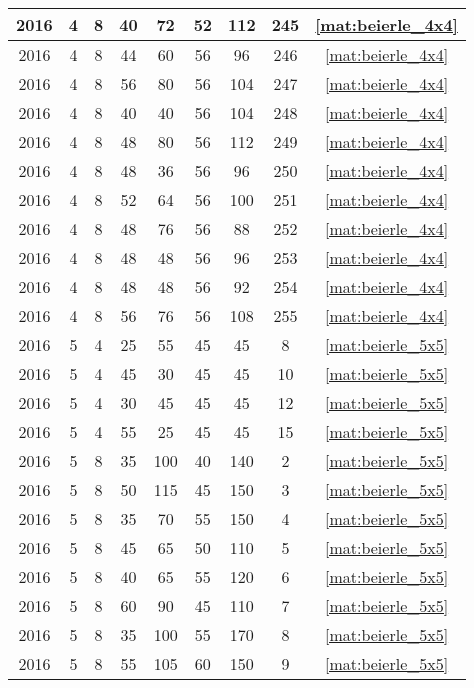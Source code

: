 \begin{longtable}{|c|c|c|c|c|c|c|c|c|}
2016 & 4 & 8 & 40 & 72 & 52 & 112 & 245 & \eqref{mat:beierle_4x4} \\ \hline 
2016 & 4 & 8 & 44 & 60 & 56 & 96 & 246 & \eqref{mat:beierle_4x4} \\ \hline 
2016 & 4 & 8 & 56 & 80 & 56 & 104 & 247 & \eqref{mat:beierle_4x4} \\ \hline 
2016 & 4 & 8 & 40 & 40 & 56 & 104 & 248 & \eqref{mat:beierle_4x4} \\ \hline 
2016 & 4 & 8 & 48 & 80 & 56 & 112 & 249 & \eqref{mat:beierle_4x4} \\ \hline 
2016 & 4 & 8 & 48 & 36 & 56 & 96 & 250 & \eqref{mat:beierle_4x4} \\ \hline 
2016 & 4 & 8 & 52 & 64 & 56 & 100 & 251 & \eqref{mat:beierle_4x4} \\ \hline 
2016 & 4 & 8 & 48 & 76 & 56 & 88 & 252 & \eqref{mat:beierle_4x4} \\ \hline 
2016 & 4 & 8 & 48 & 48 & 56 & 96 & 253 & \eqref{mat:beierle_4x4} \\ \hline 
2016 & 4 & 8 & 48 & 48 & 56 & 92 & 254 & \eqref{mat:beierle_4x4} \\ \hline 
2016 & 4 & 8 & 56 & 76 & 56 & 108 & 255 & \eqref{mat:beierle_4x4} \\ \hline 
2016 & 5 & 4 & 25 & 55 & 45 & 45 & 8 & \eqref{mat:beierle_5x5} \\ \hline 
2016 & 5 & 4 & 45 & 30 & 45 & 45 & 10 & \eqref{mat:beierle_5x5} \\ \hline 
2016 & 5 & 4 & 30 & 45 & 45 & 45 & 12 & \eqref{mat:beierle_5x5} \\ \hline 
2016 & 5 & 4 & 55 & 25 & 45 & 45 & 15 & \eqref{mat:beierle_5x5} \\ \hline 
2016 & 5 & 8 & 35 & 100 & 40 & 140 & 2 & \eqref{mat:beierle_5x5} \\ \hline 
2016 & 5 & 8 & 50 & 115 & 45 & 150 & 3 & \eqref{mat:beierle_5x5} \\ \hline 
2016 & 5 & 8 & 35 & 70 & 55 & 150 & 4 & \eqref{mat:beierle_5x5} \\ \hline 
2016 & 5 & 8 & 45 & 65 & 50 & 110 & 5 & \eqref{mat:beierle_5x5} \\ \hline 
2016 & 5 & 8 & 40 & 65 & 55 & 120 & 6 & \eqref{mat:beierle_5x5} \\ \hline 
2016 & 5 & 8 & 60 & 90 & 45 & 110 & 7 & \eqref{mat:beierle_5x5} \\ \hline 
2016 & 5 & 8 & 35 & 100 & 55 & 170 & 8 & \eqref{mat:beierle_5x5} \\ \hline 
2016 & 5 & 8 & 55 & 105 & 60 & 150 & 9 & \eqref{mat:beierle_5x5} \\ \hline 

\end{longtable}
